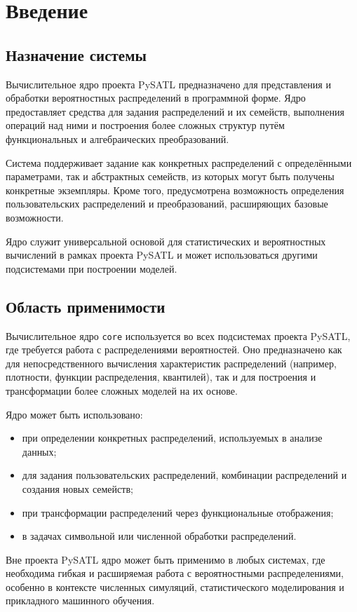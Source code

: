 \chapter{Введение}
\section{Назначение системы}
Вычислительное ядро проекта PySATL предназначено для представления и обработки вероятностных распределений в программной форме. Ядро предоставляет средства для задания распределений и их семейств, выполнения операций над ними и построения более сложных структур путём функциональных и алгебраических преобразований.

Система поддерживает задание как конкретных распределений с определёнными параметрами, так и абстрактных семейств, из которых могут быть получены конкретные экземпляры. Кроме того, предусмотрена возможность определения пользовательских распределений и преобразований, расширяющих базовые возможности.

Ядро служит универсальной основой для статистических и вероятностных вычислений в рамках проекта PySATL и может использоваться другими подсистемами при построении моделей.

\section{Область применимости}
Вычислительное ядро \texttt{core} используется во всех подсистемах проекта PySATL, где требуется работа с распределениями вероятностей. Оно предназначено как для непосредственного вычисления характеристик распределений (например, плотности, функции распределения, квантилей), так и для построения и трансформации более сложных моделей на их основе.

Ядро может быть использовано:
\begin{itemize}
    \item при определении конкретных распределений, используемых в анализе данных;
    \item для задания пользовательских распределений, комбинации распределений и создания новых семейств;
    \item при трансформации распределений через функциональные отображения;
    \item в задачах символьной или численной обработки распределений.
\end{itemize}

Вне проекта PySATL ядро может быть применимо в любых системах, где необходима гибкая и расширяемая работа с вероятностными распределениями, особенно в контексте численных симуляций, статистического моделирования и прикладного машинного обучения.

